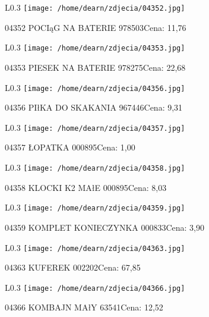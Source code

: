\begin{wrapfigure}{L}{0.3\textwidth}
\texttt{[image: /home/dearn/zdjecia/04352.jpg]}
\end{wrapfigure}
04352 POCIąG NA BATERIE                               978503Cena: 11,76\newline
\begin{wrapfigure}{L}{0.3\textwidth}
\texttt{[image: /home/dearn/zdjecia/04353.jpg]}
\end{wrapfigure}
04353 PIESEK NA BATERIE                               978275Cena: 22,68\newline
\begin{wrapfigure}{L}{0.3\textwidth}
\texttt{[image: /home/dearn/zdjecia/04356.jpg]}
\end{wrapfigure}
04356 PIłKA DO SKAKANIA                              967446Cena: 9,31\newline
\begin{wrapfigure}{L}{0.3\textwidth}
\texttt{[image: /home/dearn/zdjecia/04357.jpg]}
\end{wrapfigure}
04357 ŁOPATKA                                         000895Cena: 1,00\newline
\begin{wrapfigure}{L}{0.3\textwidth}
\texttt{[image: /home/dearn/zdjecia/04358.jpg]}
\end{wrapfigure}
04358 KLOCKI K2 MAłE                                  000895Cena: 8,03\newline
\begin{wrapfigure}{L}{0.3\textwidth}
\texttt{[image: /home/dearn/zdjecia/04359.jpg]}
\end{wrapfigure}
04359 KOMPLET KONIECZYNKA                           000833Cena: 3,90\newline
\begin{wrapfigure}{L}{0.3\textwidth}
\texttt{[image: /home/dearn/zdjecia/04363.jpg]}
\end{wrapfigure}
04363 KUFEREK                                         002202Cena: 67,85\newline
\begin{wrapfigure}{L}{0.3\textwidth}
\texttt{[image: /home/dearn/zdjecia/04366.jpg]}
\end{wrapfigure}
04366 KOMBAJN MAłY                                    63541Cena: 12,52\newline
